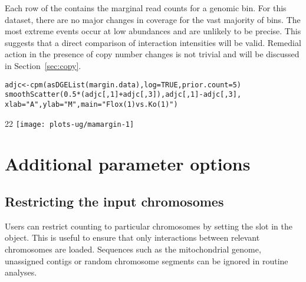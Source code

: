 \documentclass{report}\usepackage[]{graphicx}\usepackage[usenames,dvipsnames]{color}
\makeatletter
\def\maxwidth{ %
  \ifdim\Gin@nat@width>\linewidth
    \linewidth
  \else
    \Gin@nat@width
  \fi
}
\newcommand{\hlnum}[1]{\textcolor[rgb]{0.816,0.125,0.439}{#1}}%
\newcommand{\hlstr}[1]{\textcolor[rgb]{0.251,0.627,0.251}{#1}}%
\newcommand{\hlopt}[1]{\textcolor[rgb]{0,0,0}{#1}}%
\newcommand{\hlstd}[1]{\textcolor[rgb]{0.251,0.251,0.251}{#1}}%
\newcommand{\hlkwb}[1]{\textcolor[rgb]{0,0,0}{#1}}%
\newcommand{\hlkwc}[1]{\textcolor[rgb]{0.251,0.251,0.251}{#1}}%
\newcommand{\hlkwd}[1]{\textcolor[rgb]{0.878,0.439,0.125}{#1}}%
\newenvironment{knitrout}{}{} %
\makeatother
\begin{document}
Each row of the  contains the marginal read counts for a genomic bin.
For this dataset, there are no major changes in coverage for the vast majority of bins.
The most extreme events occur at low abundances and are unlikely to be precise. 
This suggests that a direct comparison of interaction intensities will be valid.
Remedial action in the presence of copy number changes is not trivial and will be discussed in Section~\ref{sec:copy}.

\begin{knitrout}
\color{fgcolor}\begin{kframe}
\begin{alltt}
\hlstd{adjc} \hlkwb{<-} \hlkwd{cpm}\hlstd{(}\hlkwd{asDGEList}\hlstd{(margin.data),} \hlkwc{log}\hlstd{=}\hlnum{TRUE}\hlstd{,} \hlkwc{prior.count}\hlstd{=}\hlnum{5}\hlstd{)}
\hlkwd{smoothScatter}\hlstd{(}\hlnum{0.5}\hlopt{*}\hlstd{(adjc[,}\hlnum{1}\hlstd{]}\hlopt{+}\hlstd{adjc[,}\hlnum{3}\hlstd{]), adjc[,}\hlnum{1}\hlstd{]}\hlopt{-}\hlstd{adjc[,}\hlnum{3}\hlstd{],}
              \hlkwc{xlab}\hlstd{=}\hlstr{"A"}\hlstd{,} \hlkwc{ylab}\hlstd{=}\hlstr{"M"}\hlstd{,} \hlkwc{main}\hlstd{=}\hlstr{"Flox (1) vs. Ko (1)"}\hlstd{)}
\end{alltt}
\end{kframe}\begin{adjustwidth}{2\fltoffset}{2\fltoffset}
\texttt{[image: plots-ug/mamargin-1]} \end{adjustwidth}
\end{knitrout}

\section{Additional parameter options}

\subsection{Restricting the input chromosomes}
\label{sec:restrictchr}

Users can restrict counting to particular chromosomes by setting the  slot in the  object.
This is useful to ensure that only interactions between relevant chromosomes are loaded.
Sequences such as the mitochondrial genome, unassigned contigs or random chromosome segments can be ignored in routine analyses.
\end{document}
